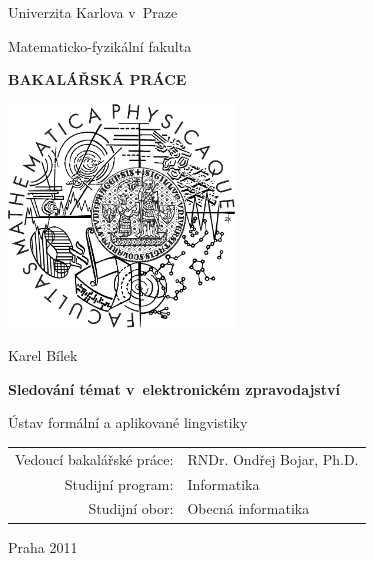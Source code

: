 \documentclass[12pt,a4paper]{report}
\begin{document}
    






\pagestyle{empty}
\begin{center}

\large

Univerzita Karlova v~Praze

\medskip

Matematicko-fyzikální fakulta

\vfill

{\bf\Large BAKALÁŘSKÁ PRÁCE}

\vfill
\centerline{\mbox{\includegraphics[width=60mm]{logo.pdf}}}


\vfill
\vspace{5mm}

{\LARGE Karel Bílek}

\vspace{15mm}

{\LARGE\bfseries Sledování témat v~elektronickém zpravodajství}

\vfill

Ústav formální a aplikované lingvistiky

\vfill

\begin{tabular}{rl}

Vedoucí bakalářské práce: & RNDr. Ondřej Bojar, Ph.D. \\
\noalign{\vspace{2mm}}
Studijní program: & Informatika \\
\noalign{\vspace{2mm}}
Studijní obor: & Obecná informatika \\
\end{tabular}

\vfill

Praha 2011

\end{center}
\end{document}
